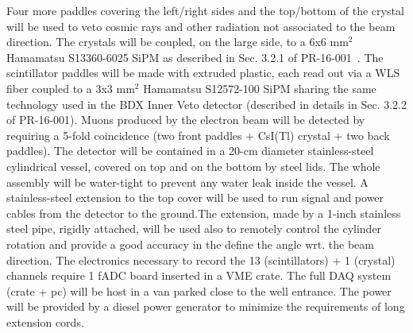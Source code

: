 Four more  paddles covering  the left/right sides and the top/bottom of the crystal will be used to veto cosmic rays and other radiation not associated to the beam direction.
The crystals will be coupled, on the large side,  to a 6x6 mm$^2$ Hamamatsu S13360-6025 SiPM as described in Sec. 3.2.1 of  PR-16-001~\cite{bdx-proposal}. The scintillator paddles will be  made with extruded plastic, each  read out via a WLS fiber coupled to a 3x3 mm$^2$ Hamamatsu S12572-100 SiPM sharing the same technology used in the BDX Inner Veto detector (described in details in Sec. 3.2.2 of  PR-16-001).
Muons produced by the electron beam will be detected by requiring a 5-fold coincidence (two front paddles + CsI(Tl) crystal + two back  paddles).
The detector will be contained  in a 20-cm diameter stainless-steel cylindrical vessel, covered on top and on the bottom by steel lids. The whole assembly will  be water-tight to prevent any water leak inside the vessel. A stainless-steel  extension to the top cover will be used  to run signal and power cables from the detector to the ground.The extension, made by a 1-inch stainless steel pipe,  rigidly attached, will be used also  to remotely control the cylinder rotation and provide a good accuracy in the define the angle wrt. the beam direction.
The electronics necessary to record the 13 (scintillators) + 1 (crystal) channels require 1 fADC board inserted in a VME crate. The full DAQ system (crate + pc)  will be host in a van parked close to the well entrance. The power will be provided by a diesel power generator to minimize the requirements of long extension cords.

